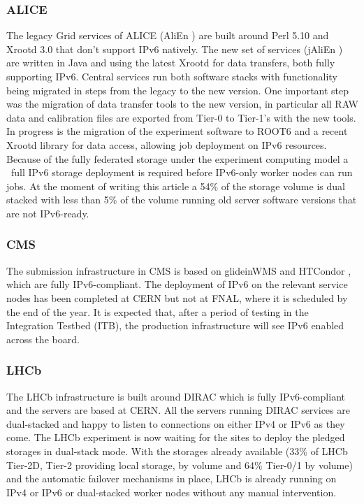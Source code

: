 \subsubsection {ALICE}
The legacy Grid services of ALICE (AliEn \cite{alien}) are built around Perl 5.10 and Xrootd\cite{xrootd} 3.0 that don’t support IPv6 natively. The new set of services (jAliEn \cite{jalien}) are written in Java and using the latest Xrootd for data transfers, both fully supporting IPv6. Central services run both software stacks with functionality being migrated in steps from the legacy to the new version. One important step was the migration of data transfer tools to the new version, in particular all RAW data and calibration files are exported from Tier-0 to Tier-1's with the new tools. In progress is the migration of the experiment software to ROOT6 and a recent Xrootd library for data access, allowing job deployment on IPv6 resources.
Because of the fully federated storage under the experiment computing model a ~full IPv6 storage deployment is required before IPv6-only worker nodes can run jobs. At the moment of writing this article a 54\% of the storage volume is dual stacked with less than 5\% of the volume running old server software versions that are not IPv6-ready.


\subsubsection {CMS}
The submission infrastructure in CMS is based on glideinWMS \cite{glideinwms} and HTCondor \cite{htcondor}, which are fully IPv6-compliant. The deployment of IPv6 on the relevant service nodes has been completed at CERN but not at FNAL, where it is scheduled by the end of the year. It is expected that, after a period of testing in the Integration Testbed (ITB), the production infrastructure will see IPv6 enabled across the board.

\subsubsection {LHCb}
The LHCb infrastructure is built around DIRAC \cite{dirac} which is fully IPv6-compliant and the servers are based at CERN. All the servers running DIRAC services are dual-stacked and happy to listen to connections on either IPv4 or IPv6 as they come. The LHCb experiment is now waiting for the sites to deploy the pledged storages in dual-stack mode. With the storages already available (33\% of LHCb Tier-2D, Tier-2 providing local storage, by volume and 64\% Tier-0/1 by volume) and the automatic failover mechanisms in place, LHCb is already running on IPv4 or IPv6 or dual-stacked worker nodes without any manual intervention.
